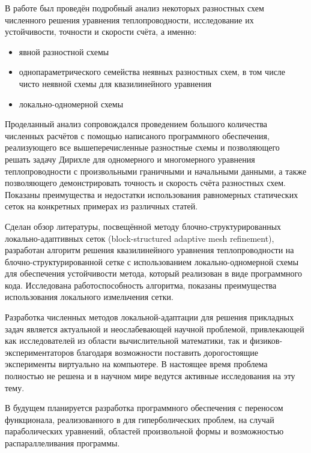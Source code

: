 В работе был проведён подробный анализ некоторых разностных схем численного решения уравнения теплопроводности, исследование их устойчивости, точности и скорости счёта, а именно:
\begin{itemize}
    \item явной разностной схемы
    \item однопараметрического семейства неявных разностных схем, в том числе чисто неявной схемы для квазилинейного уравнения
    \item локально-одномерной схемы
\end{itemize}
Проделанный анализ сопровождался проведением большого количества численных расчётов с помощью написаного программного обеспечения, реализующего все вышеперечисленные разностные схемы и позволяющего решать задачу Дирихле для одномерного и многомерного уравнения теплопроводности с произвольными граничными и начальными данными, а также позволяющего демонстрировать точность и скорость счёта разностных схем.
Показаны преимущества и недостатки использования равномерных статических сеток на конкретных примерах из различных статей.

Сделан обзор литературы, посвещённой методу блочно-структурированных локально-адаптивных сеток (block-structured adaptive mesh refinement), разработан алгоритм решения квазилинейного уравнения теплопроводности на блочно-структурированной сетке с использованием локально-одномерной схемы для обеспечения устойчивости метода, который реализован в виде программного кода.
Исследована работоспособность алгоритма, показаны преимущества использования локального измельчения сетки.

Разработка численных методов локальной-адаптации для решения прикладных задач является актуальной и неослабевающей научной проблемой, привлекающей как исследователей из области вычислительной математики, так и физиков-экспериментаторов благодаря возможности поставить дорогостоящие эксперименты виртуально на компьютере.
В настоящее время проблема полностью не решена и в научном мире ведутся активные исследования на эту тему.

В будущем планируется разработка программного обеспечения с переносом функционала, реализованного в \cite{ranocha2022adaptive, schlottkelakemper2021purely, schlottkelakemper2020trixi} для гиперболических проблем, на случай параболических уравнений, областей произвольной формы и возможностью распараллеливания программы.